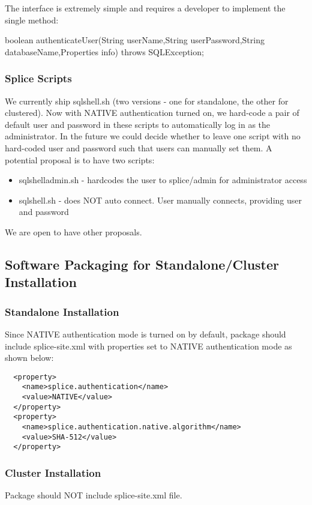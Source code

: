 \documentclass{article}
\begin{document}
The interface is extremely simple and requires a developer to implement the
single method:

boolean authenticateUser(String userName,String userPassword,String
databaseName,Properties info) throws SQLException;

\subsubsection{Splice Scripts}

We currently ship sqlshell.sh (two versions - one for standalone, the other for clustered). Now with NATIVE authentication 
turned on, we hard-code a pair of default user and password in these scripts to automatically log in as the administrator.
In the future we could decide whether to leave one script with no hard-coded user and password such that users can manually 
set them. A potential proposal is to have two scripts:  

\begin{itemize}
\item sqlshelladmin.sh - hardcodes the user to splice/admin for administrator access
\item sqlshell.sh - does NOT auto connect.  User manually connects, providing user and password
\end{itemize}

We are open to have other proposals. 

\subsection{Software Packaging for Standalone/Cluster Installation}
\subsubsection{Standalone Installation}
Since NATIVE authentication mode is turned on by default, package should include splice-site.xml with properties set to NATIVE authentication mode as shown below:
\begin{lstlisting}
  <property> 
    <name>splice.authentication</name> 
    <value>NATIVE</value> 
  </property> 
  <property> 
    <name>splice.authentication.native.algorithm</name> 
    <value>SHA-512</value> 
  </property> 
\end{lstlisting}

\subsubsection{Cluster Installation}
Package should NOT include splice-site.xml file.
\end{document}
